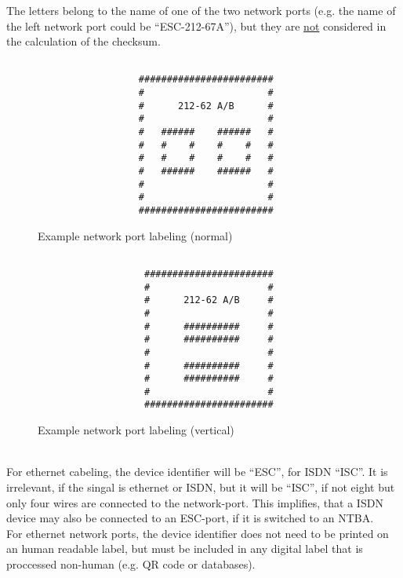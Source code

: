The letters belong to the name of one of the two network ports (e.g. the
name of the left network port could be ``ESC-212-67A''), but they are
\underline{not} considered in the calculation of the checksum. \\


\begin{minipage}[t]{.42\textwidth}
	\begin{figure}[H]
		\begin{verbatim}

			      ########################
			      #                      #
			      #      212-62 A/B      #
			      #                      #
			      #   ######    ######   #
			      #   #    #    #    #   #
			      #   #    #    #    #   #
			      #   ######    ######   #
			      #                      #
			      #                      #
			      ########################
		\end{verbatim}

		\caption{Example network port labeling (normal)}
	\end{figure}
\end{minipage}
\hfill
\begin{minipage}[t]{.42\textwidth}
	\begin{figure}[H]
		\begin{verbatim}

			       #######################
			       #                     #
			       #      212-62 A/B     #
			       #                     #
			       #      ##########     #
			       #      ##########     #
			       #                     #
			       #      ##########     #
			       #      ##########     #
			       #                     #
			       #######################
		\end{verbatim}

		\caption{Example network port labeling (vertical)}
	\end{figure}
\end{minipage} \\

For ethernet cabeling, the device identifier will be ``ESC'', for ISDN ``ISC''.
It is irrelevant, if the singal is ethernet or ISDN, but it will be ``ISC'', if
not eight but only four wires are connected to the network-port. This implifies,
that a ISDN device may also be connected to an ESC-port, if it is switched to
an NTBA. \\

For ethernet network ports, the device identifier does not need to be printed
on an human readable label, but must be included in any digital label that is
proccessed non-human (e.g. QR code or databases).
